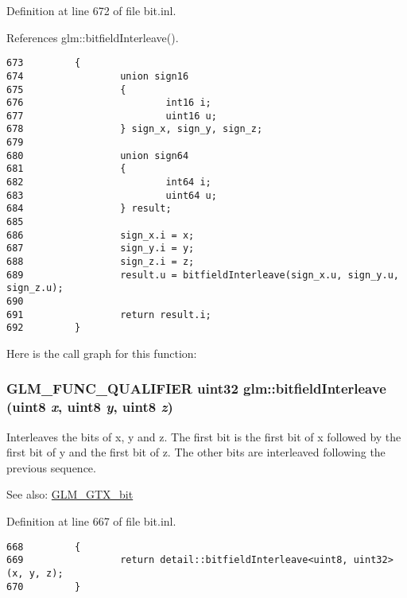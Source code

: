 Definition at line 672 of file bit.inl.

References glm::bitfieldInterleave().

\begin{Code}\begin{verbatim}673         {
674                 union sign16
675                 {
676                         int16 i;
677                         uint16 u;
678                 } sign_x, sign_y, sign_z;
679 
680                 union sign64
681                 {
682                         int64 i;
683                         uint64 u;
684                 } result;
685 
686                 sign_x.i = x;
687                 sign_y.i = y;
688                 sign_z.i = z;
689                 result.u = bitfieldInterleave(sign_x.u, sign_y.u, sign_z.u);
690 
691                 return result.i;
692         }
\end{verbatim}
\end{Code}




Here is the call graph for this function:\hypertarget{group__gtx__bit_gb9d593a2e916beb8f8137a0dbeae3afe}{
\subsubsection[bitfieldInterleave]{\setlength{\rightskip}{0pt plus 5cm}GLM\_\-FUNC\_\-QUALIFIER uint32 glm::bitfieldInterleave (uint8 {\em x}, \/  uint8 {\em y}, \/  uint8 {\em z})}}
\label{group__gtx__bit_gb9d593a2e916beb8f8137a0dbeae3afe}


Interleaves the bits of x, y and z. The first bit is the first bit of x followed by the first bit of y and the first bit of z. The other bits are interleaved following the previous sequence.

\begin{Desc}
\item[See also:]\hyperlink{group__gtx__bit}{GLM\_\-GTX\_\-bit} \end{Desc}


Definition at line 667 of file bit.inl.

\begin{Code}\begin{verbatim}668         {
669                 return detail::bitfieldInterleave<uint8, uint32>(x, y, z);
670         }
\end{verbatim}
\end{Code}


